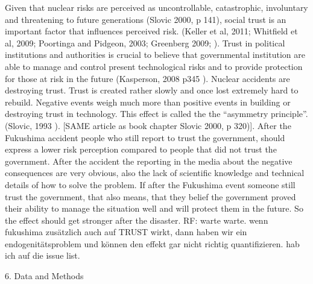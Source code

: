   
Given that nuclear risks are perceived as uncontrollable, catastrophic, involuntary and threatening to future generations (Slovic 2000, p 141),  social trust is an important factor that influences perceived risk. (Keller et al, 2011; Whitfield et al, 2009; Poortinga and Pidgeon, 2003; Greenberg 2009; \citep{Whitfield:2009ku,Poortinga:2003cb,Keller:2011gb, Greenberg:2009fx}). Trust in political institutions and authorities is crucial to believe that governmental institution are able to manage and control present technological risks and to provide protection for those at risk in the future (Kasperson, 2008 p345 \citep{Kasperson:2008tw}).  
Nuclear accidents are destroying trust. Trust is created rather slowly and once lost extremely hard to rebuild. Negative events weigh much more than positive events in building or destroying trust in technology. This effect is called the the ``asymmetry principle''. (Slovic, 1993 \citep{Slovic:1993gm}). [SAME article as book chapter Slovic 2000, p 320)].  
After the Fukushima accident people who still report to trust the government, should express a lower risk perception compared to people that did not trust the government. After the accident the reporting in the media about the negative consequences are very obvious, also the lack of scientific knowledge and technical details of how to solve the problem. If after the Fukushima event someone still trust the government, that also means, that they belief the government proved their ability to manage the situation well and will protect them in the future. So the effect should get stronger after the disaster.
RF: warte warte. wenn fukushima zusätzlich auch auf TRUST wirkt, dann haben wir ein endogenitätsproblem und können den effekt gar nicht richtig quantifizieren. hab ich auf die issue list.

    

6. Data and Methods 

